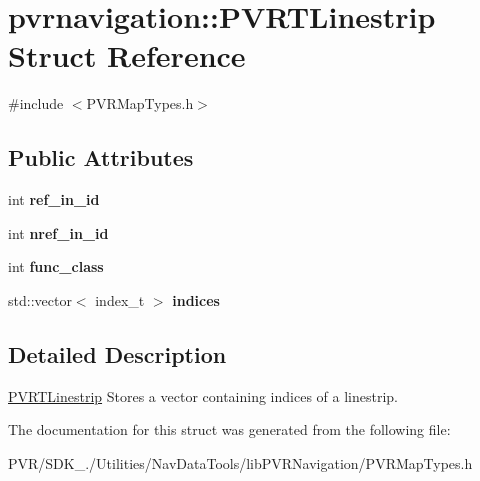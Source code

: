 \hypertarget{structpvrnavigation_1_1_p_v_r_t_linestrip}{\section{pvrnavigation\+:\+:P\+V\+R\+T\+Linestrip Struct Reference}
\label{structpvrnavigation_1_1_p_v_r_t_linestrip}
}


{\ttfamily \#include $<$P\+V\+R\+Map\+Types.\+h$>$}

\subsection*{Public Attributes}
\begin{DoxyCompactItemize}
\item 
\hypertarget{structpvrnavigation_1_1_p_v_r_t_linestrip_a687a62fac4416d89bedbb955e3b54ebe}{int {\bfseries ref\+\_\+in\+\_\+id}}\label{structpvrnavigation_1_1_p_v_r_t_linestrip_a687a62fac4416d89bedbb955e3b54ebe}

\item 
\hypertarget{structpvrnavigation_1_1_p_v_r_t_linestrip_a4dcb09d26ac6caeda17571955c57e09d}{int {\bfseries nref\+\_\+in\+\_\+id}}\label{structpvrnavigation_1_1_p_v_r_t_linestrip_a4dcb09d26ac6caeda17571955c57e09d}

\item 
\hypertarget{structpvrnavigation_1_1_p_v_r_t_linestrip_ad60bb7d3fb588a2d18d215c661827753}{int {\bfseries func\+\_\+class}}\label{structpvrnavigation_1_1_p_v_r_t_linestrip_ad60bb7d3fb588a2d18d215c661827753}

\item 
\hypertarget{structpvrnavigation_1_1_p_v_r_t_linestrip_a3605fbfc20e6d4db7ad51aeaf8338128}{std\+::vector$<$ index\+\_\+t $>$ {\bfseries indices}}\label{structpvrnavigation_1_1_p_v_r_t_linestrip_a3605fbfc20e6d4db7ad51aeaf8338128}

\end{DoxyCompactItemize}


\subsection{Detailed Description}


  \hyperlink{structpvrnavigation_1_1_p_v_r_t_linestrip}{P\+V\+R\+T\+Linestrip}  Stores a vector containing indices of a linestrip. 

The documentation for this struct was generated from the following file\+:\begin{DoxyCompactItemize}
\item 
P\+V\+R/\+S\+D\+K\+\_./\+Utilities/\+Nav\+Data\+Tools/lib\+P\+V\+R\+Navigation/P\+V\+R\+Map\+Types.\+h\end{DoxyCompactItemize}
